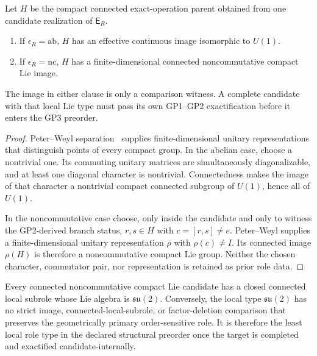 \documentclass[12pt,a4paper]{article}
\begin{document}
\begin{lemma}
\label{p2:lem:peter-weyl-finite-image-reduction}
Let \(H\) be the compact connected exact-operation parent obtained from one
candidate realization of \(\mathsf E_R\).
\begin{enumerate}[label=(\roman*), leftmargin=2em]
\item If \(\epsilon_R=\mathrm{ab}\), \(H\) has an effective
continuous image isomorphic to \(U(1)\).
\item If \(\epsilon_R=\mathrm{nc}\), \(H\) has a finite-dimensional connected
noncommutative compact Lie image.
\end{enumerate}
The image in either clause is only a comparison witness.  A complete candidate
with that local Lie type must pass its own GP1--GP2 exactification before it
enters the GP3 preorder.
\end{lemma}

\begin{proof}
Peter--Weyl separation~\cite{Peter1927} supplies finite-dimensional unitary
representations that distinguish points of every compact group.  In the
abelian case, choose a nontrivial one.  Its commuting unitary matrices are
simultaneously diagonalizable, and at least one diagonal character is
nontrivial.  Connectedness makes the image of that character a nontrivial
compact connected subgroup of \(U(1)\), hence all of \(U(1)\).

In the noncommutative case choose, only inside the candidate and only to
witness the GP2-derived branch status, \(r,s\in H\) with
\(c=[r,s]\ne e\).  Peter--Weyl supplies a finite-dimensional unitary
representation \(\rho\) with \(\rho(c)\ne I\).  Its connected image
\(\rho(H)\) is therefore a noncommutative compact Lie group.  Neither the
chosen character, commutator pair, nor representation is retained as prior
role data.
\end{proof}

\begin{lemma}
\label{p2:lem:a1-least-local-reduction}
Every connected noncommutative compact Lie candidate has a closed
connected local subrole whose Lie algebra is
\(\mathfrak{su}(2)\).  Conversely, the local type
\(\mathfrak{su}(2)\) has no strict image, connected-local-subrole, or
factor-deletion comparison that preserves the geometrically primary
order-sensitive role.  It is therefore the least local role type in the
declared structural preorder once the target is completed and exactified
candidate-internally.
\end{lemma}
\end{document}
